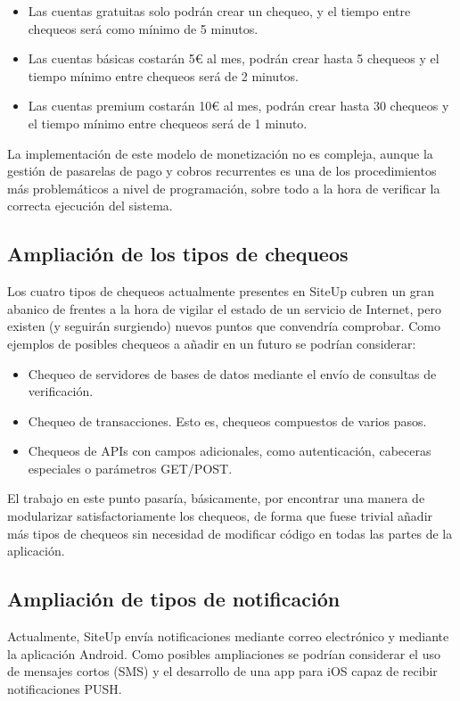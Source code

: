 \begin{itemize}
\item Las cuentas gratuitas solo podrán crear un chequeo, y el tiempo entre
  chequeos será como mínimo de 5 minutos.
\item Las cuentas básicas costarán 5€ al mes, podrán crear hasta 5 chequeos y el
  tiempo mínimo entre chequeos será de 2 minutos.
\item Las cuentas premium costarán 10€ al mes, podrán crear hasta 30 chequeos y
  el tiempo mínimo entre chequeos será de 1 minuto.
\end{itemize}

La implementación de este modelo de monetización no es compleja, aunque la
gestión de pasarelas de pago y cobros recurrentes es una de los procedimientos
más problemáticos a nivel de programación, sobre todo a la hora de verificar la
correcta ejecución del sistema. 

\subsection{Ampliación de los tipos de chequeos}

Los cuatro tipos de chequeos actualmente presentes en SiteUp cubren un gran
abanico de frentes a la hora de vigilar el estado de un servicio de Internet,
pero existen (y seguirán surgiendo) nuevos puntos que convendría comprobar. Como
ejemplos de posibles chequeos a añadir en un futuro se podrían considerar:

\begin{itemize}
\item Chequeo de servidores de bases de datos mediante el envío de consultas de
  verificación.
\item Chequeo de transacciones. Esto es, chequeos compuestos de varios pasos.
\item Chequeos de APIs con campos adicionales, como autenticación, cabeceras
  especiales o parámetros GET/POST.
\end{itemize}

El trabajo en este punto pasaría, básicamente, por encontrar una manera de
modularizar satisfactoriamente los chequeos, de forma que fuese trivial añadir
más tipos de chequeos sin necesidad de modificar código en todas las partes de
la aplicación.

\subsection{Ampliación de tipos de notificación}

Actualmente, SiteUp envía notificaciones mediante correo electrónico y mediante
la aplicación Android. Como posibles ampliaciones se podrían considerar el uso
de mensajes cortos (SMS) y el desarrollo de una app para iOS capaz de recibir
notificaciones PUSH.

